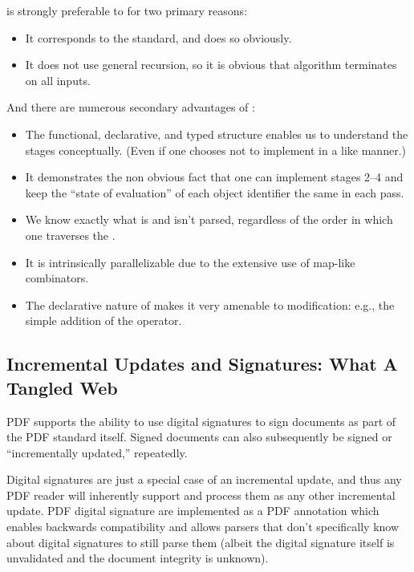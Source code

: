 \ssp{} is strongly preferable to \dsp{} for two primary reasons:
\begin{itemize}
\item It corresponds to the standard, and does so obviously.
\item It does not use general recursion, so it is obvious that \ssp{}
  algorithm terminates on all inputs.
\end{itemize}
And there are numerous secondary advantages of \ssp{}:
\begin{itemize}
\item The functional, declarative, and typed structure enables
  us to understand the stages conceptually.  (Even if one chooses
  not to implement in a like manner.)
\item It demonstrates the non obvious fact that one can
  implement stages 2--4 and keep the ``state of evaluation'' of each
  object identifier the same in each pass.
\item We know exactly what is and isn't parsed, regardless of the
  order in which one traverses the .
\item It is intrinsically parallelizable due to the extensive use of
  map-like combinators.
\item The declarative nature of \ssp{} makes it very amenable to
  modification: e.g., the simple addition of the 
  operator.
\end{itemize}

\subsection{Incremental Updates and Signatures: What A Tangled Web}
\label{sec:updates-and-signatures}

PDF supports the ability to use digital signatures to sign documents
as part of the PDF standard itself.  Signed documents can also
subsequently be signed or ``incrementally updated,'' repeatedly.

Digital signatures are just a special case of an incremental update, and
thus any PDF reader will inherently support and process them as any other
incremental update. PDF digital signature are implemented as a PDF annotation which 
enables backwards compatibility and
allows parsers that don't specifically know about digital signatures to still
parse them (albeit the digital signature itself is unvalidated and the document integrity is unknown).

